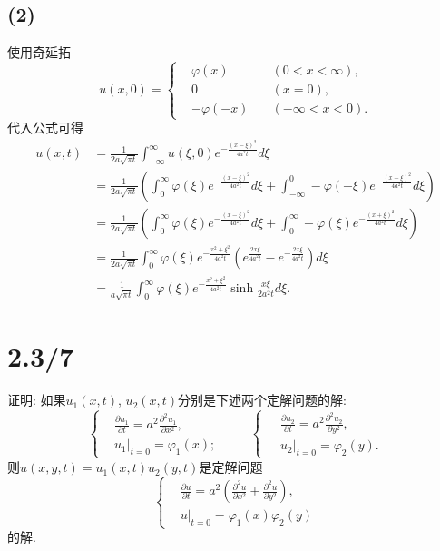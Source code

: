 \documentclass[11pt,a4paper]{article}
\begin{document}
\subsection*{(2)}

使用奇延拓
$$u(x,0)=\left\{\begin{aligned}
     & \varphi(x)   & \quad(0<x<\infty),  \\
     & 0            & \quad (x=0),        \\
     & -\varphi(-x) & \quad(-\infty<x<0).
  \end{aligned}\right.$$
代入公式可得
\begin{align*}
  u(x,t)
   & =\frac{1}{2a\sqrt{\pi t}}\int_{-\infty}^\infty u(\xi,0)e^{-\frac{(x-\xi)^2}{4a^2t}}d\xi                   \\
   & =\frac{1}{2a\sqrt{\pi t}}\left(\int_0^\infty\varphi(\xi)e^{-\frac{(x-\xi)^2}{4a^2t}}d\xi
  +\int_{-\infty}^0-\varphi(-\xi)e^{-\frac{(x-\xi)^2}{4a^2t}}d\xi\right)                                       \\
   & =\frac{1}{2a\sqrt{\pi t}}\left(\int_0^\infty\varphi(\xi)e^{-\frac{(x-\xi)^2}{4a^2t}}d\xi
  +\int_0^\infty-\varphi(\xi)e^{-\frac{(x+\xi)^2}{4a^2t}}d\xi\right)                                           \\
   & =\frac{1}{2a\sqrt{\pi t}}\int_0^\infty\varphi(\xi)e^{-\frac{x^2+\xi^2}{4a^2t}}
  \left(e^{\frac{2x\xi}{4a^2t}}-e^{-\frac{2x\xi}{4a^2t}}\right)d\xi                                            \\
   & =\frac{1}{a\sqrt{\pi t}}\int_0^\infty\varphi(\xi)e^{-\frac{x^2+\xi^2}{4a^2t}}\sinh\frac{x\xi}{2a^2t}d\xi.
\end{align*}

\section{2.3/7}
\begin{problem}
证明: 如果$u_1(x,t)$, $u_2(x,t)$分别是下述两个定解问题的解:
$$\left\{\begin{aligned}
     & \frac{\partial u_1}{\partial t}=a^2\frac{\partial^2u_1}{\partial x^2}, \\
     & u_1|_{t=0}=\varphi_1(x);
  \end{aligned}\qquad\right\{\begin{aligned}
     & \frac{\partial u_2}{\partial t}=a^2\frac{\partial^2u_2}{\partial y^2}, \\
     & u_2|_{t=0}=\varphi_2(y).
  \end{aligned}$$
则$u(x,y,t)=u_1(x,t)u_2(y,t)$是定解问题
$$\left\{\begin{aligned}
     & \frac{\partial u}{\partial t}=a^2\left(\frac{\partial^2u}{\partial x^2}+\frac{\partial^2u}{\partial y^2}\right), \\
     & u|_{t=0}=\varphi_1(x)\varphi_2(y)
  \end{aligned}\right.$$
的解.
\end{problem}
\end{document}
